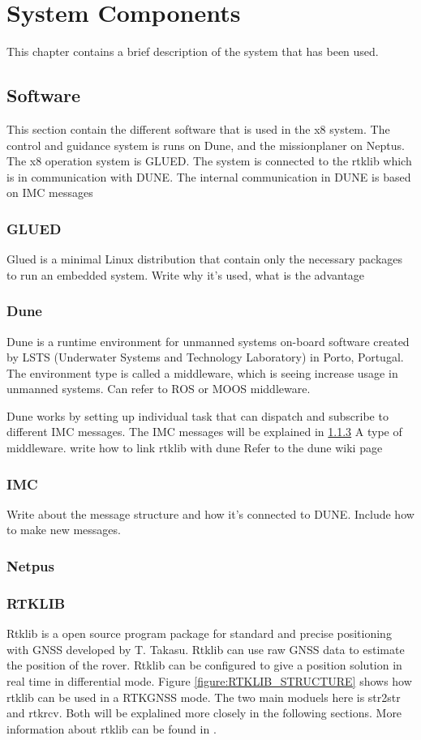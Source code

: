 
\chapter{System Components}
This chapter contains a brief description of the system that has been used.
\section{Software}
This section contain the different software that is used in the x8 system. The control and guidance system is runs on Dune, and the missionplaner on Neptus. The x8 operation system is GLUED. The system is connected to the rtklib which is in communication with DUNE. The internal communication in DUNE is based on IMC messages
\subsection{GLUED}
Glued is a minimal Linux distribution that contain only the necessary packages to run an embedded system. Write why it's used, what is the advantage
\subsection{Dune}
Dune is a runtime environment for unmanned systems on-board software created by LSTS (Underwater Systems and Technology Laboratory) in Porto, Portugal. The environment type is called a middleware, which is seeing increase usage in unmanned systems. Can refer to ROS or MOOS middleware.

Dune works by setting up individual task that can dispatch and subscribe to different IMC messages. The IMC messages will be explained in \ref{ss:IMC}
A type of middleware. write how to link rtklib with dune
Refer to the dune wiki page
\subsection{IMC}\label{ss:IMC}
Write about the message structure and how it's connected to DUNE. Include how to make new messages.
\subsection{Netpus}

\subsection{RTKLIB}
Rtklib is a open source program package for standard and precise positioning with GNSS developed by T. Takasu. Rtklib can use raw GNSS data to estimate the position of the rover. Rtklib can be configured to give a position solution in real time in differential mode. Figure \ref{figure:RTKLIB_STRUCTURE} shows how rtklib can be used in a RTKGNSS mode. The two main moduels here is str2str and rtkrcv. Both will be explalined more closely in the following sections. More information about  rtklib can be found in \citep{Rtklib242}.

